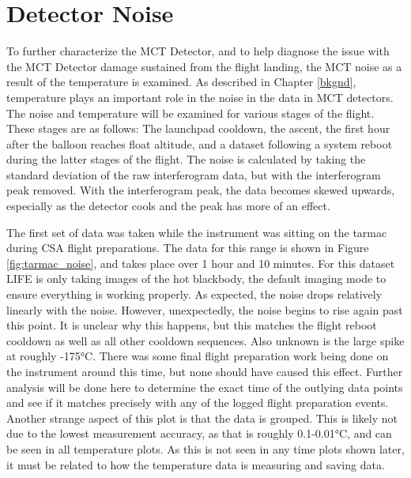 \section{Detector Noise}
To further characterize the MCT Detector, and to help diagnose the issue with the MCT Detector damage sustained from the flight landing, the MCT noise as a result of the temperature is examined. As described in Chapter \ref{bkgnd}, temperature plays an important role in the noise in the data in MCT detectors. The noise and temperature will be examined for various stages of the flight. These stages are as follows: The launchpad cooldown, the ascent, the first hour after the balloon reaches float altitude, and a dataset following a system reboot during the latter stages of the flight. The noise is calculated by taking the standard deviation of the raw interferogram data, but with the interferogram peak removed. With the interferogram peak, the data becomes skewed upwards, especially as the detector cools and the peak has more of an effect.

The first set of data was taken while the instrument was sitting on the tarmac during CSA flight preparations. The data for this range is shown in Figure \ref{fig:tarmac_noise}, and takes place over 1 hour and 10 minutes. For this dataset LIFE is only taking images of the hot blackbody, the default imaging mode to ensure everything is working properly. As expected, the noise drops relatively linearly with the noise. However, unexpectedly, the noise begins to rise again past this point. It is unclear why this happens, but this matches the flight reboot cooldown as well as all other cooldown sequences. Also unknown is the large spike at roughly -175°C. There was some final flight preparation work being done on the instrument around this time, but none should have caused this effect. Further analysis will be done here to determine the exact time of the outlying data points and see if it matches precisely with any of the logged flight preparation events. Another strange aspect of this plot is that the data is grouped. This is likely not due to the lowest measurement accuracy, as that is roughly 0.1-0.01°C, and can be seen in all temperature plots. As this is not seen in any time plots shown later, it must be related to how the temperature data is measuring and saving data.

